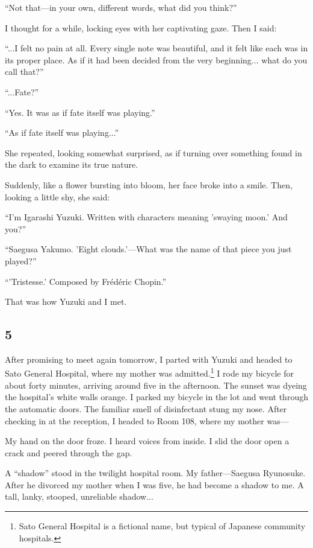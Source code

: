 \documentclass[
    a4paper,
    12pt,
    twoside,
    openany,
    UTF8,
    fontset=windows
]{ctexbook}
\begin{document}
``Not that---in your own, different words, what did you think?''

I thought for a while, locking eyes with her captivating gaze. Then I said:

``...I felt no pain at all. Every single note was beautiful, and it felt like each was in its proper place. As if it had been decided from the very beginning... what do you call that?''

``...Fate?''

``Yes. It was as if fate itself was playing.''

``As if fate itself was playing...''

She repeated, looking somewhat surprised, as if turning over something found in the dark to examine its true nature.

Suddenly, like a flower bursting into bloom, her face broke into a smile. Then, looking a little shy, she said:

``I'm Igarashi Yuzuki. Written with characters meaning 'swaying moon.' And you?''

``Saegusa Yakumo. 'Eight clouds.'---What was the name of that piece you just played?''

``'Tristesse.' Composed by Frédéric Chopin.''

That was how Yuzuki and I met.


\subsection*{5}

After promising to meet again tomorrow, I parted with Yuzuki and headed to Sato General Hospital, where my mother was admitted.\footnote{Sato General Hospital is a fictional name, but typical of Japanese community hospitals.} I rode my bicycle for about forty minutes, arriving around five in the afternoon. The sunset was dyeing the hospital's white walls orange. I parked my bicycle in the lot and went through the automatic doors. The familiar smell of disinfectant stung my nose. After checking in at the reception, I headed to Room 108, where my mother was---

My hand on the door froze. I heard voices from inside. I slid the door open a crack and peered through the gap.

A ``shadow'' stood in the twilight hospital room. My father---Saegusa Ryunosuke. After he divorced my mother when I was five, he had become a shadow to me. A tall, lanky, stooped, unreliable shadow...
\end{document}
